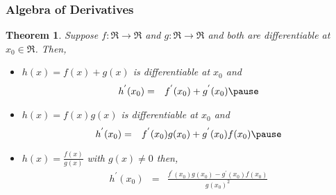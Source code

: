 \documentclass{beamer}
\newtheorem{thm}{Theorem}
\numberwithin{equation}{section}
\begin{document}
\begin{frame}
\frametitle{Algebra of Derivatives}

\begin{thm} Suppose $f:\Re \rightarrow \Re$ and $g:\Re \rightarrow \Re$ and both are differentiable at $x_{0} \in \Re$.  Then, \pause 
\begin{itemize}
\item[i)] $h(x) = f(x) + g(x)$ is differentiable at $x_{0}$ and \pause 
\begin{eqnarray}
h^{'} (x_{0}) & = & f^{'}(x_{0}) + g^{'} (x_{0}) \nonumber \pause 
\end{eqnarray}
\item[ii)] $h(x) = f(x) g(x) $ is differentiable at $x_{0}$ and \pause 
\begin{eqnarray}
h^{'}(x_{0}) & = & f^{'}(x_{0}) g(x_{0}) + g^{'}(x_{0}) f(x_{0}) \nonumber  \pause 
\end{eqnarray}
\item[iii)] $h(x)  = \frac{f(x) }{g(x) }$ with $g(x) \neq 0$ then, \pause 
\begin{eqnarray}
h^{'}(x_{0}) & = &  \frac{f^{'}(x_{0}) g(x_{0}) - g^{'}(x_{0}) f(x_{0})} {g(x_{0})^2} \nonumber
\end{eqnarray}
\end{itemize}
\end{thm}

\end{frame}
\end{document}
